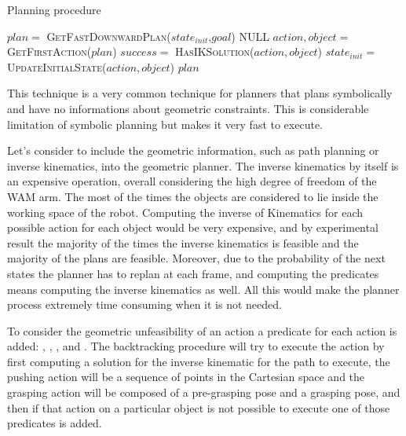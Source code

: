 \begin{algorithm}
\caption{Planning procedure}\label{alg:backtracking}
\begin{algorithmic}
\Repeat
  \State $plan =$ \textsc{GetFastDownwardPlan}($state_{init}$,$goal$)
  		\Return NULL 
  \EndIf
  \State $action, object =$ \textsc{GetFirstAction}($plan$)
  \State $success =$ \textsc{HasIKSolution}($action, object$) 
    \State $state_{init} =$ \textsc{UpdateInitialState}($action, object$) 
  \EndIf
{}
\Return $plan$ 
\EndProcedure
\end{algorithmic}
\end{algorithm}  

This technique is a very common technique for planners that plans symbolically and have no informations about geometric constraints. This is considerable limitation of symbolic planning but makes it very fast to execute.

Let's consider to include the geometric information, such as path planning or inverse kinematics, into the geometric planner. The inverse kinematics by itself is an expensive operation, overall considering the high degree of freedom of the WAM arm. The most of the times the objects are considered to lie inside the working space of the robot. Computing the inverse of Kinematics for each possible action for each object would be very expensive, and by experimental result the majority of the times the inverse kinematics is feasible and the majority of the plans are feasible. Moreover, due to the probability of the next states the planner has to replan at each frame, and computing the predicates means computing the inverse kinematics as well. All this would make the planner process extremely time consuming when it is not needed. 
  
To consider the geometric unfeasibility of an action a predicate for each action is added: , , ,  and . The backtracking procedure will try to execute the action by first computing a solution for the inverse kinematic for the path to execute, the pushing action will be a sequence of points in the Cartesian space and the grasping action will be composed of a pre-grasping pose and a grasping pose, and then if that action on a particular object is not possible to execute one of those predicates is added. 

